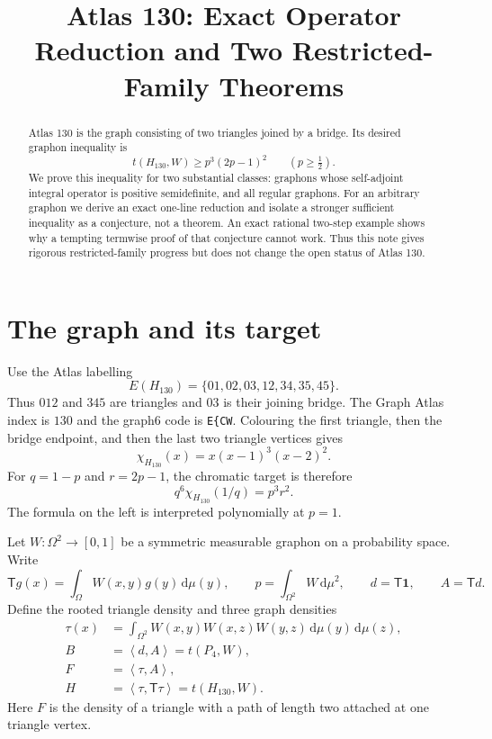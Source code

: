 \documentclass[11pt]{article}
\title{Atlas 130: Exact Operator Reduction and Two Restricted-Family Theorems}
\author{}
\date{}
\newcommand{\dd}{\,\mathrm d}
\newcommand{\one}{\mathbf 1}
\newcommand{\ip}[2]{\left\langle #1,#2\right\rangle}
\newcommand{\TT}{\mathsf T}
\begin{document}
\maketitle

\begin{abstract}
Atlas 130 is the graph consisting of two triangles joined by a bridge.
Its desired graphon inequality is
\[
 t(H_{130},W)\geq p^3(2p-1)^2\qquad (p\geq\tfrac12).
\]
We prove this inequality for two substantial classes: graphons whose
self-adjoint integral operator is positive semidefinite, and all regular
graphons.  For an arbitrary graphon we derive an exact one-line reduction
and isolate a stronger sufficient inequality as a conjecture, not a theorem.  An
exact rational two-step example shows why a tempting termwise proof of that
conjecture cannot work.  Thus this note gives rigorous restricted-family
progress but does not change the open status of Atlas 130.
\end{abstract}


\section{The graph and its target}

Use the Atlas labelling
\[
 E(H_{130})=\{01,02,03,12,34,35,45\}.
\]
Thus $012$ and $345$ are triangles and $03$ is their joining bridge.  The
Graph Atlas index is $130$ and the graph6 code is \verb|E{CW|.  Colouring
the first triangle, then the bridge endpoint, and then the last two triangle
vertices gives
\begin{equation}
 \chi_{H_{130}}(x)=x(x-1)^3(x-2)^2.
 \label{eq:chromatic}
\end{equation}
For $q=1-p$ and $r=2p-1$, the chromatic target is therefore
\begin{equation}
 q^6\chi_{H_{130}}(1/q)=p^3r^2.
 \label{eq:target}
\end{equation}
The formula on the left is interpreted polynomially at $p=1$.

Let $W\colon\Omega^2\to[0,1]$ be a symmetric measurable graphon on a
probability space.  Write
\[
 \TT g(x)=\int_\Omega W(x,y)g(y)\dd\mu(y),
 \qquad p=\int_{\Omega^2}W\dd\mu^2,
 \qquad d=\TT\one,
 \qquad A=\TT d.
\]
Define the rooted triangle density and three graph densities
\begin{align*}
 \tau(x)&=\int_{\Omega^2}
 W(x,y)W(x,z)W(y,z)\dd\mu(y)\dd\mu(z),\\
 B&=\ip dA=t(P_4,W),\\
 F&=\ip\tau A,\\
 H&=\ip\tau{\TT\tau}=t(H_{130},W).
\end{align*}
Here $F$ is the density of a triangle with a path of length two attached
at one triangle vertex.
\end{document}
